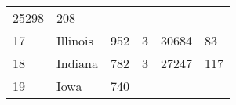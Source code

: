 \documentclass[]{article}
\begin{document}
\begin{longtable}[]{@{}llllll@{}}
\begin{minipage}[t]{0.18\columnwidth}
25298\strut
\end{minipage} & \begin{minipage}[t]{0.14\columnwidth}\raggedright
208\strut
\end{minipage}\tabularnewline
\begin{minipage}[t]{0.05\columnwidth}\raggedright
17\strut
\end{minipage} & \begin{minipage}[t]{0.17\columnwidth}\raggedright
Illinois\strut
\end{minipage} & \begin{minipage}[t]{0.16\columnwidth}\raggedright
952\strut
\end{minipage} & \begin{minipage}[t]{0.12\columnwidth}\raggedright
3\strut
\end{minipage} & \begin{minipage}[t]{0.18\columnwidth}\raggedright
30684\strut
\end{minipage} & \begin{minipage}[t]{0.14\columnwidth}\raggedright
83\strut
\end{minipage}\tabularnewline
\begin{minipage}[t]{0.05\columnwidth}\raggedright
18\strut
\end{minipage} & \begin{minipage}[t]{0.17\columnwidth}\raggedright
Indiana\strut
\end{minipage} & \begin{minipage}[t]{0.16\columnwidth}\raggedright
782\strut
\end{minipage} & \begin{minipage}[t]{0.12\columnwidth}\raggedright
3\strut
\end{minipage} & \begin{minipage}[t]{0.18\columnwidth}\raggedright
27247\strut
\end{minipage} & \begin{minipage}[t]{0.14\columnwidth}\raggedright
117\strut
\end{minipage}\tabularnewline
\begin{minipage}[t]{0.05\columnwidth}\raggedright
19\strut
\end{minipage} & \begin{minipage}[t]{0.17\columnwidth}\raggedright
Iowa\strut
\end{minipage} & \begin{minipage}[t]{0.16\columnwidth}\raggedright
740\strut
\end{minipage} & \begin{minipage}[t]{0.12\columnwidth}\raggedright

\end{minipage}
\end{longtable}
\end{document}
